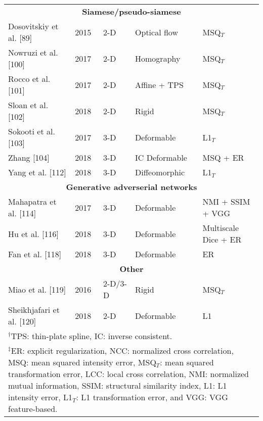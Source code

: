 \begin{table}[!htb]
\begin{tabular*}{0.85\textwidth}{l l l l l}
\midrule
\multicolumn{5}{c}{\textbf{Siamese/pseudo-siamese}}
  \vspace{0.25cm} \\
  Dosovitskiy et al. [89] & 2015 & 2-D & Optical flow & MSQ$_T$ \\ %
  Nowruzi et al. [100] & 2017 & 2-D & Homography & MSQ$_T$ \\
  Rocco et al. [101] & 2017 & 2-D & Affine + TPS & MSQ$_T$ \\
  Sloan et al. [102] & 2018 & 2-D & Rigid & MSQ$_T$ \\  %
  Sokooti et al. [103] & 2017 & 3-D & Deformable & L1$_T$ \\
  Zhang [104] & 2018 & 3-D & IC Deformable & MSQ + ER \\
  Yang et al. [112] & 2018 & 3-D & Diffeomorphic & L1$_T$ \\  %
\midrule
\multicolumn{5}{c}{\textbf{Generative adverserial networks}}
  \vspace{0.25cm} \\
  Mahapatra et al. [114] & 2017 & 3-D & Deformable & NMI + SSIM + VGG \\
  Hu et al. [116] & 2018 & 3-D & Deformable & Multiscale Dice + ER \\
  Fan et al. [118] & 2018 & 3-D & Deformable & ER \\
\midrule
\multicolumn{5}{c}{\textbf{Other}}
  \vspace{0.25cm} \\
  Miao et al. [119] & 2016 & 2-D/3-D & Rigid & MSQ$_T$ \\
  Sheikhjafari et al. [120] & 2018 & 2-D & Deformable & L1 \\
\bottomrule
\multicolumn{5}{l}{
  \begin{minipage}[t]{0.9\columnwidth}%
    \footnotesize{$^\dagger$TPS: thin-plate spline, IC: inverse consistent.}
  \end{minipage}
  } \\
\multicolumn{5}{l}{
  \begin{minipage}[t]{0.82\columnwidth}%
    \footnotesize{$^\ddagger$ER:  explicit regularization,
      NCC: normalized cross correlation,
      MSQ: mean squared intensity error,
      MSQ$_T$: mean squared transformation error,
      LCC:  local cross correlation,
      NMI:  normalized mutual information,
      SSIM:  structural similarity index,
      L1:  L1 intensity error,
      L1$_T$: L1 transformation error, and
      VGG: VGG feature-based.}
  \end{minipage}
  }
\end{tabular*}
\end{table}


